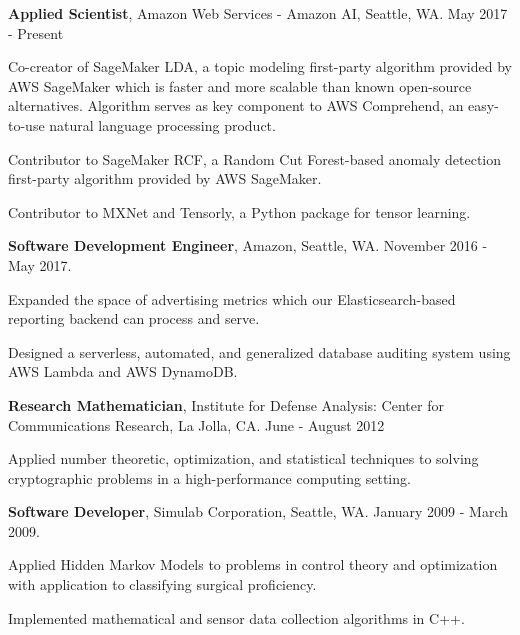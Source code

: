 \documentclass{article}
\begin{document}
\begin{itemize*}
  \setlength{\itemsep}{0pt}
  \item {\bf Applied Scientist}, Amazon Web Services - Amazon AI, Seattle, WA. May
    2017 - Present
    \begin{itemize*}
    \item Co-creator of SageMaker LDA, a topic modeling first-party algorithm
      provided by AWS SageMaker which is faster and more scalable than known
      open-source alternatives. Algorithm serves as key component to AWS
      Comprehend, an easy-to-use natural language processing product.
    \item Contributor to SageMaker RCF, a Random Cut Forest-based anomaly
      detection first-party algorithm provided by AWS SageMaker.
    \item Contributor to MXNet and Tensorly, a Python package for tensor learning.
    \end{itemize*}
  \item {\bf Software Development Engineer}, Amazon, Seattle, WA. November 2016
    - May 2017.
    \begin{itemize*}
    \item Expanded the space of advertising metrics which our
      Elasticsearch-based reporting backend can process and serve.
    \item Designed a serverless, automated, and generalized database auditing
      system using AWS Lambda and AWS DynamoDB.
    \end{itemize*}
  \item {\bf Research Mathematician}, Institute for Defense Analysis:
    Center for Communications Research, La Jolla, CA. June - August
    2012
    \begin{itemize*}
    \item Applied number theoretic, optimization, and statistical techniques to
      solving cryptographic problems in a high-performance computing setting.
    \end{itemize*}
  \item {\bf Software Developer}, Simulab Corporation, Seattle,
    WA. January 2009 - March 2009.
    \begin{itemize*}
    \item Applied Hidden Markov Models to problems in control theory and
      optimization with application to classifying surgical proficiency.
    \item Implemented mathematical and sensor data collection algorithms in C++.
    \end{itemize*}

\end{itemize*}
\end{document}
